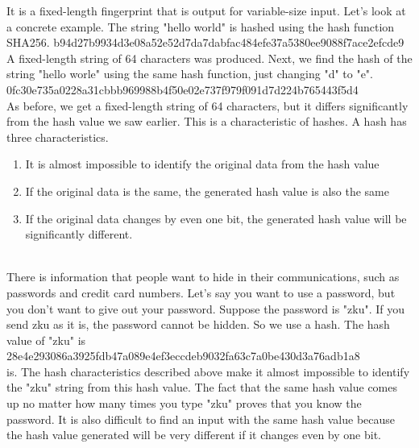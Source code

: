 \documentclass[a4paper,10pt]{jsarticle}
\begin{document}
\begin{enumerate}
    \newline
    It is a fixed-length fingerprint that is output for variable-size input.
    Let's look at a concrete example.
    The string "hello world" is hashed using the hash function SHA256.
    \newline
    \newline
    \textrm{b94d27b9934d3e08a52e52d7da7dabfac484efe37a5380ee9088f7ace2efcde9}\mbox{}\\
    \newline
    A fixed-length string of 64 characters was produced.
    Next, we find the hash of the string "hello worle" using the same hash function, just changing "d" to "e".
    \newline
    \newline
    \textrm{0fc30e735a0228a31cbbb969988b4f50e02e737f979f091d7d224b765443f5d4}\mbox{}\\
    \newline
    As before, we get a fixed-length string of 64 characters, but it differs significantly from the hash value we saw earlier. This is a characteristic of hashes.
    A hash has three characteristics.
    \newline
    \begin{enumerate}[1.]
      \item It is almost impossible to identify the original data from the hash value
      \item If the original data is the same, the generated hash value is also the same
      \item If the original data changes by even one bit, the generated hash value will be significantly different.
    \end{enumerate}\mbox{}\\
    There is information that people want to hide in their communications, such as passwords and credit card numbers.
    Let's say you want to use a password, but you don't want to give out your password.
    Suppose the password is "zku".
    If you send zku as it is, the password cannot be hidden. So we use a hash.
    The hash value of "zku" is
    \newline
    \newline
    \textrm{28e4e293086a3925fdb47a089e4ef3eccdeb9032fa63c7a0be430d3a76adb1a8}\mbox{}\\
    \newline
    is. The hash characteristics described above make it almost impossible to identify the "zku" string from this hash value. The fact that the same hash value comes up no matter how many times you type "zku" proves that you know the password. It is also difficult to find an input with the same hash value because the hash value generated will be very different if it changes even by one bit.

\end{enumerate}
\end{document}
